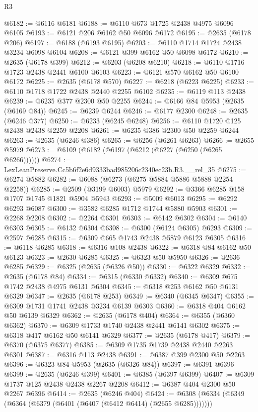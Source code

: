 \begin{lexlean}{R3}
\begin{coremodule}
@6182 := @6116 @6181
@6188 := @6110 @673 @1725 @2438 @4975 @6096 @6105
@6193 := @6121 @206 @6162 @50 @6096 @6172
@6195 := @2635 (@6178 @206)
@6197 := @6188 (@6193 @6195)
@6203 := @6110 @1714 @1724 @2438 @3234 @6098 @6104
@6208 := @6121 @399 @6162 @50 @6098 @6172
@6210 := @2635 (@6178 @399)
@6212 := @6203 (@6208 @6210)
@6218 := @6110 @1716 @1723 @2438 @2441 @6100 @6103
@6223 := @6121 @570 @6162 @50 @6100 @6172
@6225 := @2635 (@6178 @570)
@6227 := @6218 (@6223 @6225)
@6233 := @6110 @1718 @1722 @2438 @2440 @2255 @6102
@6235 := @6119 @113 @2438
@6239 := @6235 @377 @2300 @50 @2255
@6244 := @6166 @84 @5953 (@2635 (@6169 @84))
@6245 := @6239 @6244
@6246 := @6177 @2300
@6248 := @2635 (@6246 @377)
@6250 := @6233 (@6245 @6248)
@6256 := @6110 @1720 @125 @2438 @2438 @2259 @2208
@6261 := @6235 @386 @2300 @50 @2259 @6244
@6263 := @2635 (@6246 @386)
@6265 := @6256 (@6261 @6263)
@6266 := @2655 @5979
@6273 := @6109 (@6182 (@6197 (@6212 (@6227 (@6250 (@6265 @6266))))))
@6274 := LexLeanPreserve.Cc5b6f2e6d9333bad985206c2340ec23b.R3.__rel_35
@6275 := @6274 @5882
@6282 := @6088 (@6273 (@6275 @5884 @5886 @5888 @2254 @2258))
@6285 := @2509 (@3199 @6003) @5979
@6292 := @3366 @6285 @158 @1707 @1745 @1821 @5904 @5943
@6293 := @5009 @6013
@6295 := @6292 @6293 @6087
@6300 := @3582 @6285 @1712 @1744 @5880 @5903
@6301 := @2268 @2208
@6302 := @2264 @6301
@6303 := @6142 @6302
@6304 := @6140 @6303
@6305 := @6132 @6304
@6308 := @6300 (@6124 @6305) @6293
@6309 := @2597 @6285
@6315 := @6309 @665 @1743 @2438 @5879 @6123 @6305
@6316 := @6118 @6285
@6318 := @6316 @108 @2438
@6322 := @6318 @84 @6162 @50 @6123
@6323 := @2630 @6285
@6325 := @6323 @50 @5950
@6326 := @2636 @6285
@6329 := @6325 (@2635 (@6326 @50))
@6330 := @6322 @6329
@6332 := @2635 (@6178 @84)
@6334 := @6315 (@6330 @6332)
@6340 := @6309 @675 @1742 @2438 @4975 @6131 @6304
@6345 := @6318 @253 @6162 @50 @6131 @6329
@6347 := @2635 (@6178 @253)
@6349 := @6340 (@6345 @6347)
@6355 := @6309 @1731 @1741 @2438 @3234 @6139 @6303
@6360 := @6318 @404 @6162 @50 @6139 @6329
@6362 := @2635 (@6178 @404)
@6364 := @6355 (@6360 @6362)
@6370 := @6309 @1733 @1740 @2438 @2441 @6141 @6302
@6375 := @6318 @417 @6162 @50 @6141 @6329
@6377 := @2635 (@6178 @417)
@6379 := @6370 (@6375 @6377)
@6385 := @6309 @1735 @1739 @2438 @2440 @2263 @6301
@6387 := @6316 @113 @2438
@6391 := @6387 @399 @2300 @50 @2263
@6396 := @6323 @84 @5953 (@2635 (@6326 @84))
@6397 := @6391 @6396
@6399 := @2635 (@6246 @399)
@6401 := @6385 (@6397 @6399)
@6407 := @6309 @1737 @125 @2438 @2438 @2267 @2208
@6412 := @6387 @404 @2300 @50 @2267 @6396
@6414 := @2635 (@6246 @404)
@6424 := @6308 (@6334 (@6349 (@6364 (@6379 (@6401 (@6407 (@6412 @6414) (@2655 @6285)))))))

\end{coremodule}
\end{lexlean}
